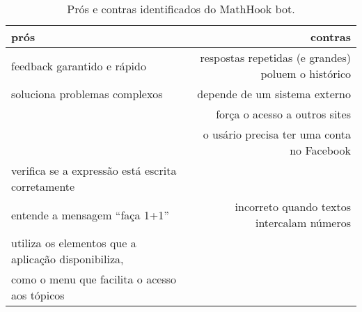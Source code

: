 \begin{table}[h!tbp]
  \centering
    \begin{tabular}{|l|r|}
    \toprule
    \rowcolor[rgb]{ .816,  .808,  .808} \textbf{prós} & \textbf{contras} \\
    \midrule
    feedback garantido e rápido & respostas repetidas (e grandes) poluem o histórico \\
    \midrule
    soluciona problemas complexos & depende de um sistema externo \\
    \midrule
    {} & força o acesso a outros sites \\
    \midrule
    {} & o usário precisa ter uma conta no Facebook \\
    \midrule
    verifica se a expressão está escrita corretamente & {} \\
    \midrule
    entende a mensagem ``faça 1+1'' & {incorreto quando textos intercalam números} \\
    \midrule
    utiliza os elementos que a aplicação disponibiliza, & {} \\como o menu que facilita o acesso aos tópicos & {} \\
    \bottomrule
    \end{tabular}%
  \caption{Prós e contras identificados do MathHook bot.}
  \label{tab:bot1}%
\end{table}%